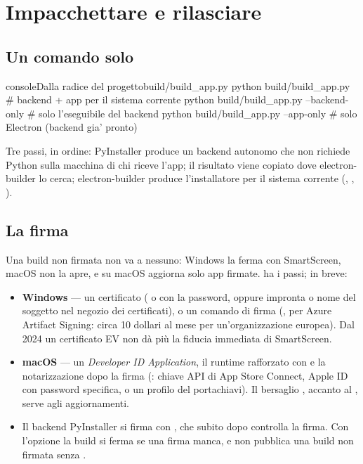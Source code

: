 \section{Impacchettare e rilasciare}\label{sez:rilascio}

\subsection{Un comando solo}

\begin{codiceInterno}{console}{Dalla radice del progetto}{build/build\_app.py}
python build/build_app.py                # backend + app per il sistema corrente
python build/build_app.py --backend-only # solo l'eseguibile del backend
python build/build_app.py --app-only     # solo Electron (backend gia' pronto)
\end{codiceInterno}

\noindent
Tre passi, in ordine: PyInstaller produce un backend autonomo che non
richiede Python sulla macchina di chi riceve l'app; il risultato viene
copiato dove electron-builder lo cerca; electron-builder produce
l'installatore per il sistema corrente (, ,
).

\subsection{La firma}

Una build non firmata non va a nessuno: Windows la ferma con SmartScreen,
macOS non la apre, e  su macOS aggiorna solo app
firmate.  ha i passi; in breve:

\begin{itemize}
  \item \textbf{Windows} --- un certificato ( o
         con la password, oppure impronta o nome del soggetto
        nel negozio dei certificati), o un comando di firma
        (, per Azure Artifact
        Signing: circa \num{10} dollari al mese per un'organizzazione
        europea). Dal 2024 un certificato EV non dà più la fiducia immediata
        di SmartScreen.
  \item \textbf{macOS} --- un \emph{Developer ID Application}, il runtime
        rafforzato con  e la notarizzazione
        dopo la firma (: chiave API di
        App Store Connect, Apple ID con password specifica, o un profilo del
        portachiavi). Il bersaglio , accanto al , serve
        agli aggiornamenti.
  \item Il backend PyInstaller si firma con , che subito
        dopo controlla la firma. Con l'opzione  la build
        si ferma se una firma manca, e  non pubblica una
        build non firmata senza .
\end{itemize}

